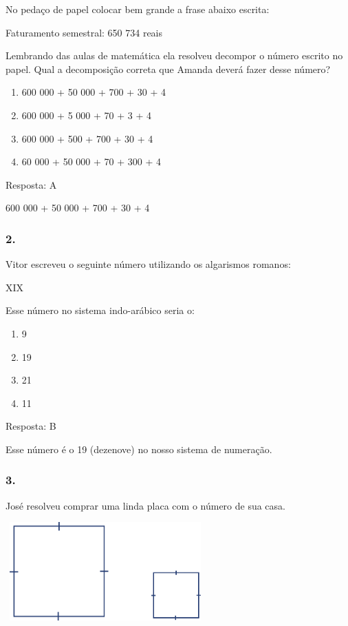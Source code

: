 No pedaço de papel colocar bem grande a frase abaixo escrita:

Faturamento semestral: 650 734 reais

Lembrando das aulas de matemática ela resolveu decompor o número escrito
no papel. Qual a decomposição correta que Amanda deverá fazer desse
número?

\begin{enumerate}
\def\labelenumi{\alph{enumi})}
\item
  600 000 + 50 000 + 700 + 30 + 4
\item
  600 000 + 5 000 + 70 + 3 + 4
\item
  600 000 + 500 + 700 + 30 + 4
\item
  60 000 + 50 000 + 70 + 300 + 4
\end{enumerate}

Resposta: A

600 000 + 50 000 + 700 + 30 + 4

\subsubsection{2.}\label{section-11}

Vitor escreveu o seguinte número utilizando os algarismos romanos:

XIX

Esse número no sistema indo-arábico seria o:

\begin{enumerate}
\def\labelenumi{\alph{enumi})}
\item
  9
\item
  19
\item
  21
\item
  11
\end{enumerate}

Resposta: B

Esse número é o 19 (dezenove) no nosso sistema de numeração.

\subsubsection{3.}\label{section-12}

José resolveu comprar uma linda placa com o número de sua casa.

\includegraphics[width=3.02500in,height=1.48973in]{media/image26.png}

